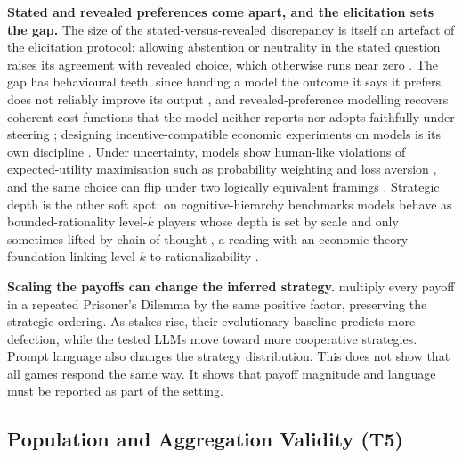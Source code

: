 \documentclass[11pt]{article}
\begin{document}
\textbf{Stated and revealed preferences come apart, and the elicitation sets the
gap.} The size of the stated-versus-revealed discrepancy is itself an artefact of
the elicitation protocol: allowing abstention or neutrality in the stated
question raises its agreement with revealed choice, which otherwise runs near
zero \cite{mahajan2026mindgap}. The gap has behavioural teeth, since handing a
model the outcome it says it prefers does not reliably improve its output
\cite{zhou2026incentives}, and revealed-preference modelling recovers coherent
cost functions that the model neither reports nor adopts faithfully under
steering \cite{yamin2026revealed}; designing incentive-compatible economic
experiments on models is its own discipline \cite{wang2025expecon}. Under
uncertainty, models show human-like violations of expected-utility maximisation
such as probability weighting and loss aversion \cite{jia2024decision}, and the
same choice can flip under two logically equivalent framings
\cite{robinson2025framing,wang2026framing}. Strategic depth is the other soft
spot: on cognitive-hierarchy benchmarks models behave as bounded-rationality
level-$k$ players whose depth is set by scale and only sometimes lifted by
chain-of-thought \cite{liu2025chbench,kader2024emergence,jia2025agentic}, a
reading with an economic-theory foundation linking level-$k$ to
rationalizability \cite{liu2024levelk}.

\textbf{Scaling the payoffs can change the inferred strategy.}
\citet{huynh2026payoff} multiply every payoff in a repeated Prisoner's Dilemma
by the same positive factor, preserving the strategic ordering. As stakes rise,
their evolutionary baseline predicts more defection, while the tested LLMs move
toward more cooperative strategies. Prompt language also changes the strategy
distribution. This does not show that all games respond the same way. It shows
that payoff magnitude and language must be reported as part of the setting.

\subsection{Population and Aggregation Validity (T5)}
\label{app:t5evidence}
\end{document}
